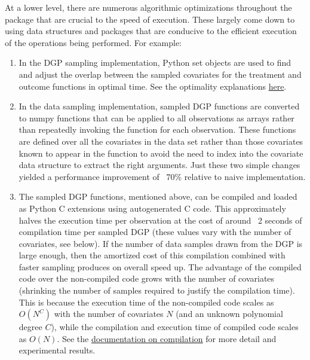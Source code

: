 \documentclass[./main.tex]{subfiles}
\begin{document}
At a lower level, there are numerous algorithmic optimizations throughout the package that are crucial to the speed of execution. These largely come down to using data structures and packages that are conducive to the efficient execution of the operations being performed. For example:

\begin{enumerate}
    \item In the DGP sampling implementation, Python set objects are used to find and adjust the overlap between the sampled covariates for the treatment and outcome functions in optimal time. See the optimality explanations \href{https://wiki.python.org/moin/TimeComplexity}{here}.
    
    \item In the data sampling implementation, sampled DGP functions are converted to numpy functions that can be applied to all observations as arrays rather than repeatedly invoking the function for each observation. These functions are defined over all the covariates in the data set rather than those covariates known to appear in the function to avoid the need to index into the covariate data structure to extract the right arguments. Just these two simple changes yielded a performance improvement of ~70\% relative to naive implementation.
    
    \item The sampled DGP functions, mentioned above, can be compiled and loaded as Python C extensions using autogenerated C code. This approximately halves the execution time per observation at the cost of around ~2 seconds of compilation time per sampled DGP (these values vary with the number of covariates, see below). If the number of data samples drawn from the DGP is large enough, then the amortized cost of this compilation combined with faster sampling produces on overall speed up. The advantage of the compiled code over the non-compiled code grows with the number of covariates (shrinking the number of samples required to justify the compilation time). This is because the execution time of the non-compiled code scales as $O(N^C)$ with the number of covariates $N$ (and an unknown polynomial degree $C$), while the compilation and execution time of compiled code scales as $O(N)$. See the \href{\RTDurl/advanced/parallelization.html}{documentation on compilation} for more detail and experimental results.
    
\end{enumerate}

\end{document}
